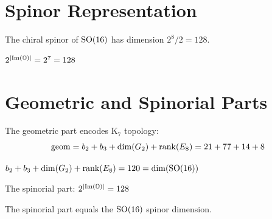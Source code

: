 \section{Spinor Representation}

\begin{definition}[SO(16) Spinor]\label{def:spinor_SO16}
    \leanok
    The chiral spinor of $\mathrm{SO}(16)$ has dimension $2^8/2 = 128$.
\end{definition}

\begin{theorem}\label{thm:spinor_from_octonions}
    \leanok
    $2^{|\mathrm{Im}(\mathbb{O})|} = 2^7 = 128$
\end{theorem}

\section{Geometric and Spinorial Parts}

\begin{definition}\label{def:geometric_part}
    \leanok
    The geometric part encodes K$_7$ topology:
    \[
        \mathrm{geom} = b_2 + b_3 + \mathrm{dim}(G_2) + \mathrm{rank}(E_8) = 21 + 77 + 14 + 8
    \]
\end{definition}

\begin{theorem}[Geometric = SO(16)]\label{thm:geometric_is_SO16}
    \leanok
    $b_2 + b_3 + \mathrm{dim}(G_2) + \mathrm{rank}(E_8) = 120 = \mathrm{dim}(\mathrm{SO}(16))$
\end{theorem}

\begin{definition}\label{def:spinorial_part}
    \leanok
    The spinorial part: $2^{|\mathrm{Im}(\mathbb{O})|} = 128$
\end{definition}

\begin{theorem}[Spinorial = 128]\label{thm:spinorial_is_128}
    \leanok
    The spinorial part equals the $\mathrm{SO}(16)$ spinor dimension.
\end{theorem}

